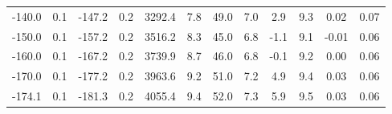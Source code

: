 \begin{tabular}{SSSSSSSSSSSS}
-140.0 & 0.1     & -147.2  & 0.2        & 3292.4 & 7.8      & 49.0  & 7.0  & 2.9    & 9.3       & 0.02  & 0.07 \\
-150.0 & 0.1     & -157.2  & 0.2        & 3516.2 & 8.3      & 45.0  & 6.8  & -1.1   & 9.1       & -0.01 & 0.06 \\
-160.0 & 0.1     & -167.2  & 0.2        & 3739.9 & 8.7      & 46.0  & 6.8  & -0.1   & 9.2       & 0.00  & 0.06 \\
-170.0 & 0.1     & -177.2  & 0.2        & 3963.6 & 9.2      & 51.0  & 7.2  & 4.9    & 9.4       & 0.03  & 0.06 \\
-174.1 & 0.1     & -181.3  & 0.2        & 4055.4 & 9.4      & 52.0  & 7.3  & 5.9    & 9.5       & 0.03  & 0.06 \\ 
\bottomrule
\end{tabular}